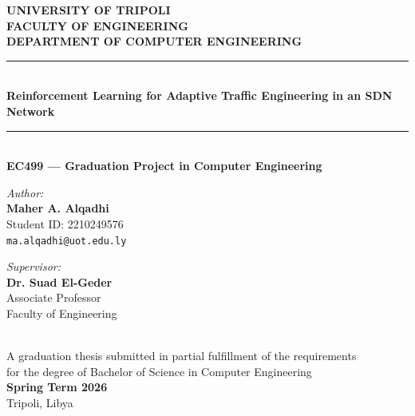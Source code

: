 \documentclass[12pt,a4paper,oneside]{report}
\begin{document}
\begin{titlepage}
    \centering
    \vspace*{0.5cm}
    {\large \textbf{UNIVERSITY OF TRIPOLI}}\\[0.2cm]
    {\large \textbf{FACULTY OF ENGINEERING}}\\[0.2cm]
    {\large \textbf{DEPARTMENT OF COMPUTER ENGINEERING}}\\[1.5cm]

    \rule{\linewidth}{1.2pt}\\[0.4cm]
    {\LARGE \textbf{Reinforcement Learning for Adaptive Traffic Engineering in an SDN Network}}\\[0.2cm]
    \rule{\linewidth}{1.2pt}\\[1.5cm]

    {\large \textbf{EC499 --- Graduation Project in Computer Engineering}}\\[2.0cm]

    \begin{minipage}{0.45\textwidth}
        \begin{flushleft} \large
            \emph{Author:}\\
            \textbf{Maher A. Alqadhi}\\
            Student ID: 2210249576\\
            \texttt{ma.alqadhi@uot.edu.ly}
        \end{flushleft}
    \end{minipage}
    \hfill
    \begin{minipage}{0.45\textwidth}
        \begin{flushright} \large
            \emph{Supervisor:}\\
            \textbf{Dr. Suad El-Geder}\\
            Associate Professor\\
            Faculty of Engineering
        \end{flushright}
    \end{minipage}\\[3.0cm]

    {\large A graduation thesis submitted in partial fulfillment of the requirements\\
    for the degree of Bachelor of Science in Computer Engineering}\\[1.5cm]

    {\large \textbf{Spring Term 2026}}\\[0.2cm]
    {\small Tripoli, Libya}
\end{titlepage}
\end{document}
